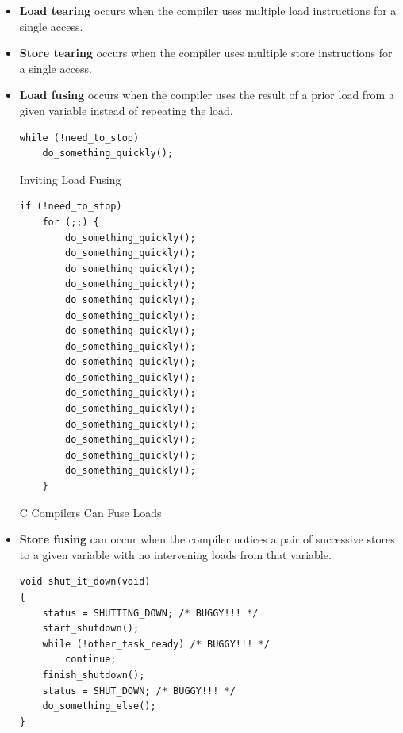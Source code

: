 \documentclass[11pt]{article}
\begin{document}
\begin{itemize}
\item \textbf{Load tearing} occurs when the compiler uses multiple load instructions for a single access.
\item \textbf{Store tearing} occurs when the compiler uses multiple store instructions for a single access.
\item \textbf{Load fusing} occurs when the compiler uses the result of a prior load from a given variable instead
of repeating the load.
\begin{listing}[htbp]
\begin{verbatim}
while (!need_to_stop)
    do_something_quickly();
\end{verbatim}
\caption{\label{l4.16}Inviting Load Fusing}
\end{listing}
\begin{listing}[htbp]
\begin{verbatim}
if (!need_to_stop)
    for (;;) {
        do_something_quickly();
        do_something_quickly();
        do_something_quickly();
        do_something_quickly();
        do_something_quickly();
        do_something_quickly();
        do_something_quickly();
        do_something_quickly();
        do_something_quickly();
        do_something_quickly();
        do_something_quickly();
        do_something_quickly();
        do_something_quickly();
        do_something_quickly();
        do_something_quickly();
        do_something_quickly();
    }
\end{verbatim}
\caption{\label{l4.17}C Compilers Can Fuse Loads}
\end{listing}
\item \textbf{Store fusing} can occur when the compiler notices a pair of successive stores to a given variable
with no intervening loads from that variable.
\begin{listing}[htbp]
\begin{verbatim}
void shut_it_down(void)
{
    status = SHUTTING_DOWN; /* BUGGY!!! */
    start_shutdown();
    while (!other_task_ready) /* BUGGY!!! */
        continue;
    finish_shutdown();
    status = SHUT_DOWN; /* BUGGY!!! */
    do_something_else();
}


\end{verbatim}
\end{listing}
\end{itemize}
\end{document}
